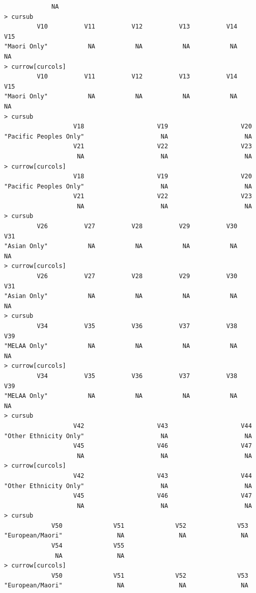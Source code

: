\documentclass[a4paper]{article}
\begin{document}
\begin{verbatim}
             NA 
> cursub 
         V10          V11          V12          V13          V14          V15 
"Maori Only"           NA           NA           NA           NA           NA 
> currow[curcols] 
         V10          V11          V12          V13          V14          V15 
"Maori Only"           NA           NA           NA           NA           NA 
> cursub 
                   V18                    V19                    V20 
"Pacific Peoples Only"                     NA                     NA 
                   V21                    V22                    V23 
                    NA                     NA                     NA 
> currow[curcols] 
                   V18                    V19                    V20 
"Pacific Peoples Only"                     NA                     NA 
                   V21                    V22                    V23 
                    NA                     NA                     NA 
> cursub 
         V26          V27          V28          V29          V30          V31 
"Asian Only"           NA           NA           NA           NA           NA 
> currow[curcols] 
         V26          V27          V28          V29          V30          V31 
"Asian Only"           NA           NA           NA           NA           NA 
> cursub 
         V34          V35          V36          V37          V38          V39 
"MELAA Only"           NA           NA           NA           NA           NA 
> currow[curcols] 
         V34          V35          V36          V37          V38          V39 
"MELAA Only"           NA           NA           NA           NA           NA 
> cursub 
                   V42                    V43                    V44 
"Other Ethnicity Only"                     NA                     NA 
                   V45                    V46                    V47 
                    NA                     NA                     NA 
> currow[curcols] 
                   V42                    V43                    V44 
"Other Ethnicity Only"                     NA                     NA 
                   V45                    V46                    V47 
                    NA                     NA                     NA 
> cursub 
             V50              V51              V52              V53 
"European/Maori"               NA               NA               NA 
             V54              V55 
              NA               NA 
> currow[curcols] 
             V50              V51              V52              V53 
"European/Maori"               NA               NA               NA 

\end{verbatim}
\end{document}
